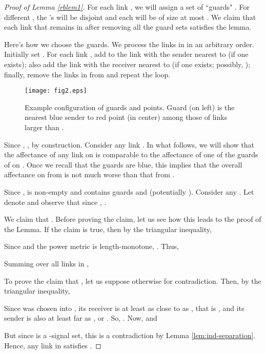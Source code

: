 \documentclass[11pt]{amsart}
\begin{document}
\begin{proof}[Proof of Lemma \ref{rblem1}]
For each link , we will assign a set of ``guards" .
For different , the 's will be disjoint and each  will be of size at most . 
We claim that each link  that
remains in  after removing all the guard sets satisfies the lemma.

Here's how we choose the guards. 
We process the links in  in an arbitrary order.
Initially set .
For each link , add to  the link 
with the sender nearest to
 (if one exists); also add the link  with the
receiver nearest to  (if one exists; possibly, ); 
finally, remove the links in  from  and repeat the loop.

\begin{figure}[htbp]
  \begin{center}
\texttt{[image: fig2.eps]}
  \end{center}
\caption{Example configuration of guards and points. Guard 
  (on left) is the nearest blue sender to red point 
  (in center) among those of links larger than . }
\label{fig:red-blue}
\end{figure}

Since , , by construction.
Consider any link .
In what follows, we will show that the affectance of any link  
 on  is comparable to the affectance of one of the guards of 
on . Once we recall that the guards are blue, this implies that the overall affectance
on  from  is not much worse than that from .

Since ,  is non-empty and contains guards
 and  (potentially ).
Consider any .
Let  denote  and observe that
since , .

We claim that . Before proving the claim, let us see how 
this leads to the proof of the Lemma. If the claim is true, then by the triangular inequality,

Since  and the
power metric is length-monotone, .
Thus, 

Summing over all links in ,



To prove the claim that , let us suppose otherwise for contradiction.
Then, by the triangular inequality,

Since  was chosen into , its receiver is at least as close to
 as , that is ,
and its sender is also at least far as , or
. So, .
Now,
 and

But since  is a -signal set,  
this is a contradiction by Lemma \ref{lem:ind-separation}.
Hence, any link  in  satisfies . 
\end{proof}
\end{document}
